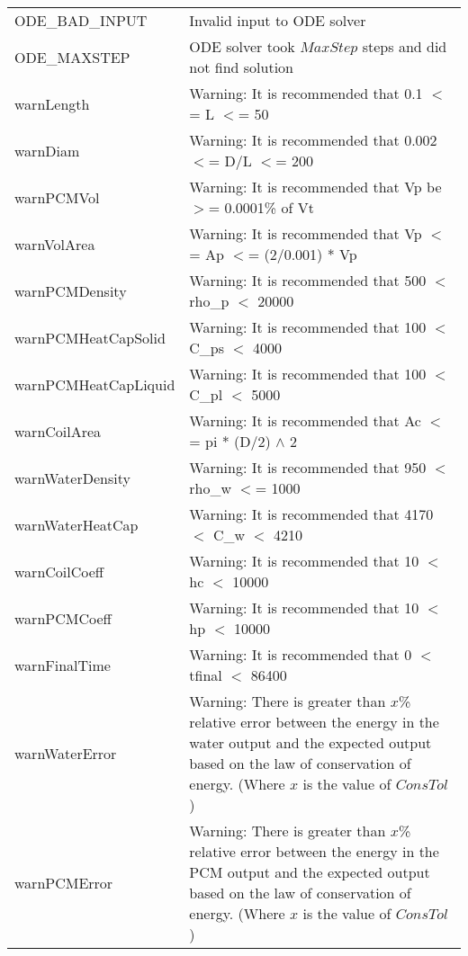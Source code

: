 \documentclass[12pt, titlepage]{article}
\begin{document}
\begin{longtable}{l p{12cm}}
ODE\_BAD\_INPUT & Invalid input to ODE solver \\
ODE\_MAXSTEP & ODE solver took $MaxStep$ steps and did not find solution \\
warnLength & Warning: It is recommended that 0.1 $<$= L $<$= 50 \\
warnDiam & Warning: It is recommended that 0.002 $<$= D/L $<$= 200 \\
warnPCMVol & Warning: It is recommended that Vp be $>$= 0.0001\% of Vt \\
warnVolArea & Warning: It is recommended that Vp $<$= Ap $<$= (2/0.001) * Vp \\
warnPCMDensity & Warning: It is recommended that 500 $<$ rho\_p $<$ 20000 \\
warnPCMHeatCapSolid & Warning: It is recommended that 100 $<$ C\_ps $<$ 4000 \\
warnPCMHeatCapLiquid & Warning: It is recommended that 100 $<$ C\_pl $<$ 5000 \\
warnCoilArea & Warning: It is recommended that Ac $<$= pi * (D/2) $\wedge$ 2 \\
warnWaterDensity & Warning: It is recommended that 950 $<$ rho\_w $<$= 1000 \\
warnWaterHeatCap & Warning: It is recommended that 4170 $<$ C\_w $<$ 4210 \\
warnCoilCoeff & Warning: It is recommended that 10 $<$ hc $<$ 10000 \\
warnPCMCoeff & Warning: It is recommended that 10 $<$ hp $<$ 10000 \\
warnFinalTime & Warning: It is recommended that 0 $<$ tfinal $<$ 86400 \\
warnWaterError & Warning: There is greater than $x$\% relative error between the energy in the water output and the expected output based on the law of conservation of energy. (Where $x$ is the value of $ConsTol$) \\
warnPCMError & Warning: There is greater than $x$\% relative error between the energy in the PCM output and the expected output based on the law of conservation of energy. (Where $x$ is the value of $ConsTol$) \\
\bottomrule
\end{longtable}
\end{document}

